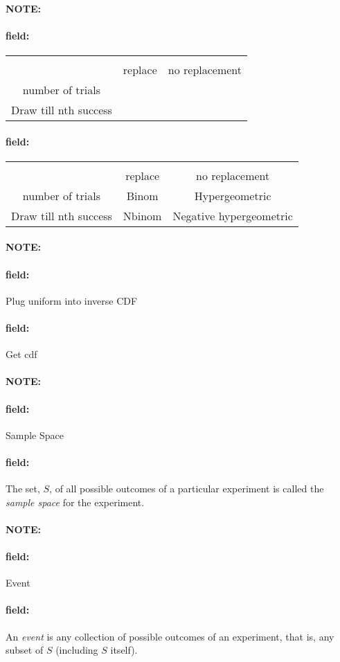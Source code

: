 \documentclass[12pt]{article}
\newenvironment{note}{\paragraph{NOTE:}}{}
\newenvironment{field}{\paragraph{field:}}{}
\begin{document}
\begin{note}
  \begin{field}
    \begin{tabular}{|c| c c |}
    \hline \\
    & replace & no replacement \\
    number of trials &  &  \\
    Draw till nth success & & \\
    \hline
    \end{tabular}
  \end{field}
  \begin{field}
    \begin{tabular}{|c| c c |}
    \hline \\
    & replace & no replacement \\
    number of trials & Binom & Hypergeometric \\
    Draw till nth success & Nbinom & Negative hypergeometric \\
    \hline
    \end{tabular}
  \end{field}
\end{note}

\begin{note}
  \begin{field}
    Plug uniform into inverse CDF
  \end{field}
  \begin{field}
    Get cdf
  \end{field}
\end{note}

\begin{note}
  \begin{field}
    Sample Space
  \end{field}
  \begin{field}
    The set, $S$, of all possible outcomes of a particular experiment is called the \textit{sample space} for the experiment.
  \end{field}
\end{note}

\begin{note}
  \begin{field}
    Event
  \end{field}
  \begin{field}
    An \textit{event} is any collection of possible outcomes of an experiment, that is, any subset of $S$ (including $S$ itself).
  \end{field}
\end{note}
\end{document}
